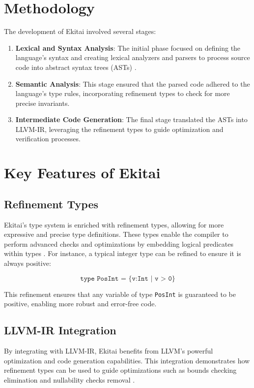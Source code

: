 \documentclass[12pt]{article}
\begin{document}
\section{Methodology}

The development of Ekitai involved several stages:
\begin{enumerate}
    \item \textbf{Lexical and Syntax Analysis}: The initial phase focused on defining the language's syntax and creating lexical analyzers and parsers to process source code into abstract syntax trees (ASTs) \cite{appel2003}.
    \item \textbf{Semantic Analysis}: This stage ensured that the parsed code adhered to the language's type rules, incorporating refinement types to check for more precise invariants.
    \item \textbf{Intermediate Code Generation}: The final stage translated the ASTs into LLVM-IR, leveraging the refinement types to guide optimization and verification processes.
\end{enumerate}

\section{Key Features of Ekitai}

\subsection{Refinement Types}

Ekitai’s type system is enriched with refinement types, allowing for more expressive and precise type definitions. These types enable the compiler to perform advanced checks and optimizations by embedding logical predicates within types \cite{jhala2020}. For instance, a typical integer type can be refined to ensure it is always positive:

\begin{equation*}
\texttt{type PosInt = \{v:Int | v > 0\}}
\end{equation*}

This refinement ensures that any variable of type \texttt{PosInt} is guaranteed to be positive, enabling more robust and error-free code.

\subsection{LLVM-IR Integration}

By integrating with LLVM-IR, Ekitai benefits from LLVM's powerful optimization and code generation capabilities. This integration demonstrates how refinement types can be used to guide optimizations such as bounds checking elimination and nullability checks removal \cite{appel2003}.
\end{document}
